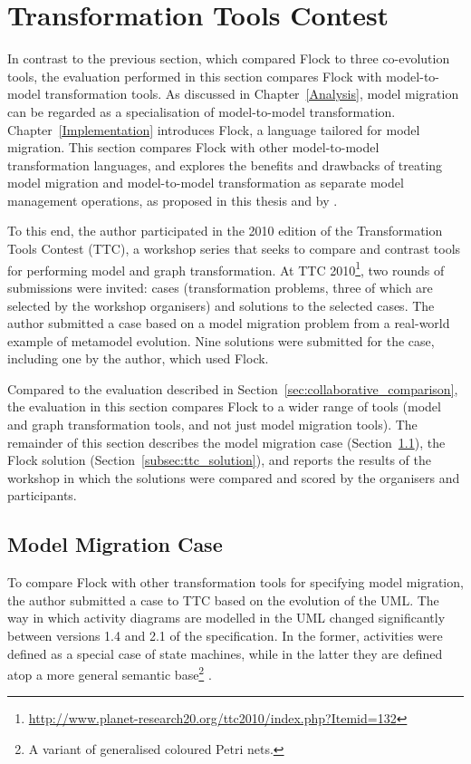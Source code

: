 
\section{Transformation Tools Contest}
\label{sec:ttc}
In contrast to the previous section, which compared Flock to three co-evolution tools, the evaluation performed in this section compares Flock with model-to-model transformation tools. As discussed in Chapter~\ref{Analysis}, model migration can be regarded as a specialisation of model-to-model transformation. Chapter~\ref{Implementation} introduces Flock, a language tailored for model migration. This section compares Flock with other model-to-model transformation languages, and explores the benefits and drawbacks of treating model migration and model-to-model transformation as separate model management operations, as proposed in this thesis and by \cite{sprinkle03thesis}.

To this end, the author participated in the 2010 edition of the Transformation Tools Contest (TTC), a workshop series that seeks to compare and contrast tools for performing model and graph transformation. At TTC 2010\footnote{\url{http://www.planet-research20.org/ttc2010/index.php?Itemid=132}}, two rounds of submissions were invited: cases (transformation problems, three of which are selected by the workshop organisers) and solutions to the selected cases. The author submitted a case based on a model migration problem from a real-world example of metamodel evolution. Nine solutions were submitted for the case, including one by the author, which used Flock.

Compared to the evaluation described in Section~\ref{sec:collaborative_comparison}, the evaluation in this section compares Flock to a wider range of tools (model and graph transformation tools, and not just model migration tools). The remainder of this section describes the model migration case (Section~\ref{subsec:ttc_case}), the Flock solution (Section~\ref{subsec:ttc_solution}), and reports the results of the workshop in which the solutions were compared and scored by the organisers and participants.


\subsection{Model Migration Case}
\label{subsec:ttc_case}
To compare Flock with other transformation tools for specifying model migration, the author submitted a case to TTC based on the evolution of the UML. The way in which activity diagrams are modelled in the UML changed significantly between versions 1.4 and 2.1 of the specification. In the former, activities were defined as a special case of state machines, while in the latter they are defined atop a more general semantic base\footnote{A variant of generalised coloured Petri nets.} \cite{selic05uml2}.

